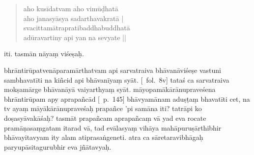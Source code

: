 \documentclass[12pt]{article}
\begin{document}
\begin{quote}
	aho kusīdatvam aho vimūḍhatā\\
	aho janasyāsya sadarthavakratā |\\
	svacittamātrapratibaddhabuddhatā\footnoteB{
		°pratibaddha°] \conj\ (\TIB; 'brel pa); °pratibuddha° \MS\ \EDD
	}\\
	adūravartiny api yan na sevyate ||
% 
% 
% 
\end{quote}

\noindent iti. tasmān nāyaṃ viśeṣaḥ.

bhrāntirūpatvenāparamārthatvam api sarvatraiva bhāvanāviśeṣe vastuni sambhavatīti na kiñcid api bhāvanīyaṃ syāt. [\MS\ fol.\ 8v] tataś ca sarvatraiva mokṣamārge bhāvanāyā vaiyarthyaṃ syāt. māyopamākārānupraveśena bhrāntirūpam apy aprapañcād [\EDD\ p.\ 145] bhāvyamānam\footnoteB{
	aprapañcād bhāvyamānam] \EDD ; aprapañcā bhāvyamāṇam
} aduṣṭaṃ bhavatīti cet, na tv ayaṃ māyākārānupraveśaḥ prapañce 'pi samāna iti? tatrāpi ko doṣasyāvakāśaḥ? tasmāt prapañcam aprapañcaṃ vā yad eva rocate pramāṇasaṃgatam itarad vā, tad evālasyaṃ vihāya mahāpuruṣārthibhir bhāvayitavyam\footnoteB{
	bhāvayitavyam] \EDD ; bhaviyitavyam \MS
} ity alam atiprasaṅgeneti. atra ca sāretaravibhāgaḥ paryupāsitagurubhir eva jñātavyaḥ.\\
\end{document}
